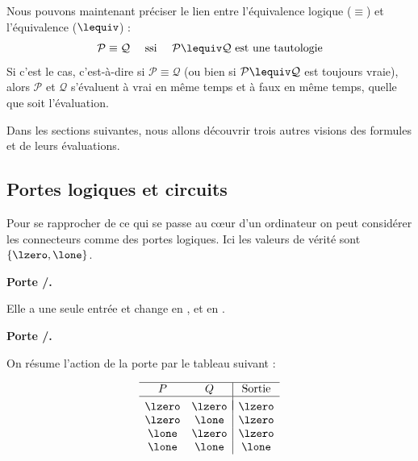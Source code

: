 \documentclass[11pt,class=report,crop=false]{standalone}
\begin{document}
Nous pouvons maintenant préciser le lien entre l'équivalence logique ($\equiv$) et l'équivalence ($\lequiv$) :
\[
\mathcal{P} \equiv \mathcal{Q} \quad \text{ ssi } \quad
\mathcal{P} \lequiv \mathcal{Q} \text{ est une tautologie}
\]
Si c'est le cas, c'est-à-dire si $\mathcal{P} \equiv \mathcal{Q}$ (ou bien si $\mathcal{P} \lequiv \mathcal{Q}$ est toujours vraie), alors $\mathcal{P}$ et $\mathcal{Q}$ s'évaluent à vrai en même temps et à faux en même temps, quelle que soit l'évaluation.

\medskip
Dans les sections suivantes, nous allons découvrir trois autres visions des formules et de leurs évaluations.

\subsection{Portes logiques et circuits}

Pour se rapprocher de ce qui se passe au cœur d'un ordinateur on peut considérer les connecteurs comme des portes logiques. Ici les valeurs de vérité sont $\{\lzero, \lone\}$.


\textbf{Porte \tnot/.}

Elle a une seule entrée et change \lzero{} en \lone, et \lone{} en \lzero.

\textbf{Porte \tand/.}


On résume l'action de la porte  par le tableau suivant :

\begin{center}
	\begin{minipage}{0.45\textwidth}
		\[			
			\begin{array}{cc|c}
				\hline
				P & Q & \text{Sortie} \\ \hline
				&&	\\[-2ex]
				\lzero & \lzero & \lzero \\
				\lzero & \lone & \lzero \\
				\lone & \lzero & \lzero \\
				\lone & \lone & \lone \\ 
			\end{array}
	\]
	\end{minipage}
	\begin{minipage}{0.45\textwidth}
	\end{minipage}
\end{center}
\end{document}
